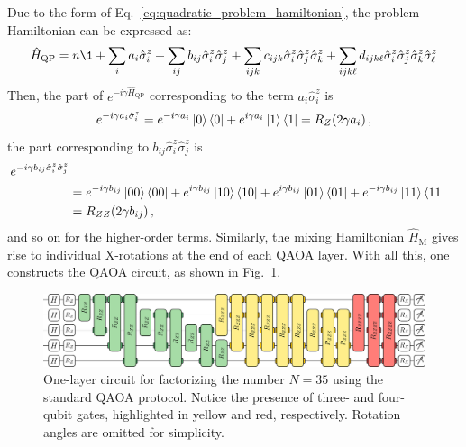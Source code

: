 Due to the form of Eq.~\ref{eq:quadratic_problem_hamiltonian}, the problem Hamiltonian can be expressed as:
\begin{equation}
    \hat{H}_\mathrm{QP} = n \1 + \sum_i a_i \hat{\sigma}^z_i
    + \sum_{ij} b_{ij} \hat{\sigma}^z_i \hat{\sigma}^z_j
    + \sum_{ijk} c_{ijk} \hat{\sigma}^z_i \hat{\sigma}^z_j \hat{\sigma}^z_k
    + \sum_{ijk\ell} d_{ijk\ell} \hat{\sigma}^z_i \hat{\sigma}^z_j \hat{\sigma}^z_k \hat{\sigma}^z_\ell
    \label{eq:expanded_problem_quadratic_hamiltonian}
\end{equation}
Then, the part of $e^{-i \gamma \hat{H}_\mathrm{QP}}$ corresponding to the term $a_i \hat{\sigma}^z_i$ is
\begin{equation}
    e^{-i \gamma a_i \hat{\sigma}^z_i} = e^{-i \gamma a_i} \ket{0}\bra{0}
    + e^{i \gamma a_i} \ket{1}\bra{1}
    = R_Z(2 \gamma a_i)\,,
\end{equation}
the part corresponding to $b_{ij} \hat{\sigma}^z_i \hat{\sigma}^z_j$ is
\begin{equation}
    \begin{split}
        e^{-i \gamma b_{ij} \hat{\sigma}^z_i \hat{\sigma}^z_j} \\
         &=e^{-i\gamma b_{ij}} \ket{00}\bra{00} + e^{i\gamma b_{ij}} \ket{10}\bra{10}
        +  e^{i\gamma b_{ij}} \ket{01}\bra{01} + e^{-i\gamma b_{ij}} \ket{11}\bra{11} \\
        &= R_{ZZ} (2 \gamma b_{ij})\,,
    \end{split}
\end{equation}
and so on for the higher-order terms. Similarly, the mixing Hamiltonian $\hat{H}_\mathrm{M}$ gives rise to
individual X-rotations at the end of each QAOA layer. With all this, one constructs the QAOA circuit, as shown
in Fig.~\ref{fig:standard_circuit}.

\begin{figure}[h]
    \centering
    \includegraphics[width=1\textwidth]{02-factorization/figs/standard_circuit_35.pdf}
    \caption{One-layer circuit for factorizing the number $N=35$ using the standard QAOA protocol. Notice the presence
    of three- and four-qubit gates, highlighted in yellow and red, respectively. Rotation angles are omitted for simplicity.}
    \label{fig:standard_circuit}
\end{figure}


